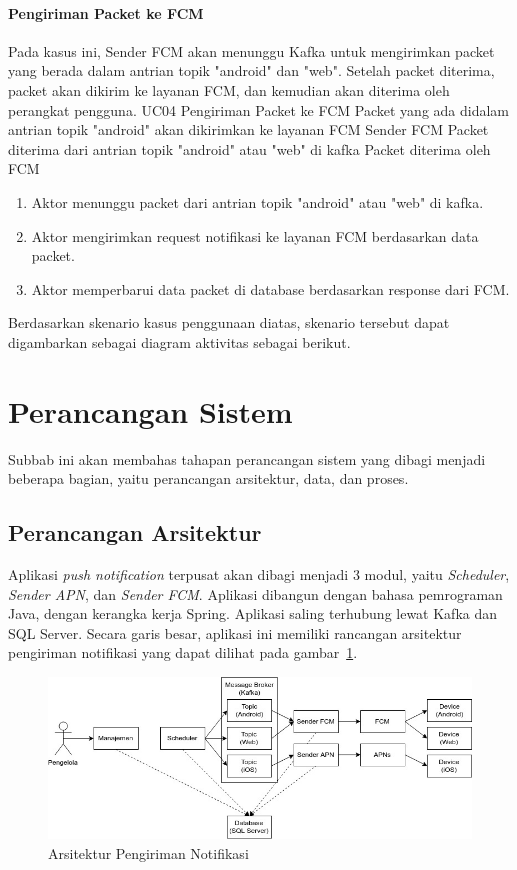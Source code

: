 \paragraph{Pengiriman Packet ke FCM}
\par Pada kasus ini, Sender FCM akan menunggu Kafka untuk mengirimkan packet yang berada dalam antrian topik "android" dan "web".
Setelah packet diterima, packet akan dikirim ke layanan FCM, dan kemudian akan diterima oleh perangkat pengguna.
\tableUcDesc
{UC04}
{Pengiriman Packet ke FCM}
{Packet yang ada didalam antrian topik "android" akan dikirimkan ke layanan FCM}
{Sender FCM}
{Packet diterima dari antrian topik "android" atau "web" di kafka}
{Packet diterima oleh FCM}
{
\begin{enumerate}
    \item Aktor menunggu packet dari antrian topik "android" atau "web" di kafka.
    \item Aktor mengirimkan request notifikasi ke layanan FCM berdasarkan data packet.
    \item Aktor memperbarui data packet di database berdasarkan response dari FCM.
\end{enumerate}
}
\par Berdasarkan skenario kasus penggunaan diatas, skenario tersebut dapat digambarkan sebagai diagram aktivitas
sebagai berikut.

\section{Perancangan Sistem}
\par Subbab ini akan membahas tahapan perancangan sistem yang dibagi menjadi beberapa bagian, yaitu perancangan
arsitektur, data, dan proses.

\subsection{Perancangan Arsitektur}
\par Aplikasi \textit{push notification} terpusat akan dibagi menjadi 3 modul, yaitu \textit{Scheduler},
\textit{Sender APN}, dan \textit{Sender FCM}.
Aplikasi dibangun dengan bahasa pemrograman Java, dengan kerangka kerja
Spring.
Aplikasi saling terhubung lewat Kafka dan SQL Server.
Secara garis besar, aplikasi ini memiliki rancangan
arsitektur pengiriman notifikasi yang dapat dilihat pada gambar~\ref{arsitektur_pengiriman_notifikasi}.
\begin{figure}[!ht]
    \centering\includegraphics[width=1\textwidth]{bab3/figures/arsitektur_pengiriman_notifikasi.jpg}
    \caption{Arsitektur Pengiriman Notifikasi}
    \label{arsitektur_pengiriman_notifikasi}
\end{figure}

